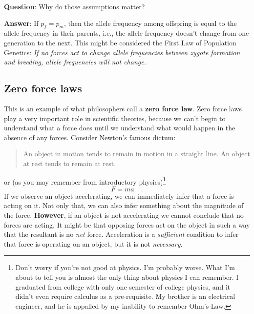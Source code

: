 \documentclass[12pt]{article}
\begin{document}
{\bf Question}: Why do those assumptions matter?

{\bf Answer}: If $p_f = p_m$, then the allele frequency among
offspring is equal to the allele frequency in their parents, i.e., the
allele frequency doesn't change from one generation to the next. This
might be considered the First Law of Population Genetics: {\it If no
  forces act to change allele frequencies between zygote formation and
  breeding, allele frequencies will not change.}

\subsection*{Zero force laws}

This is an example of what philosophers call a {\bf zero force
law}. Zero force laws play a very important role in scientific
theories, because we can't begin to understand what a force does until
we understand what would happen in the absence of any forces. Consider
Newton's famous dictum: 
\begin{quotation}
\noindent An object in motion tends to remain in motion in a straight
line. An object at rest tends to remain at rest.
\end{quotation}
or (as you may remember from introductory physics)\footnote{Don't
  worry if you're not good at physics. I'm probably worse. What I'm
  about to tell you is almost the only thing about physics I can
  remember. I graduated from college with only one semester of college
  physics, and it didn't even require calculus as a pre-requisite. My
  brother is an electrical engineer, and he is appalled by my
  inability to remember Ohm's Law.}
\[
F = ma \quad.
\]
\noindent If we observe an object accelerating, we can immediately
infer that a force is acting on it. Not only that, we can also infer
something about the magnitude of the force.  {\bf However}, if an
object is not accelerating we cannot conclude that no forces are
acting. It might be that opposing forces act on the object in such a
way that the resultant is no {\it net\/} force. Acceleration is a {\it
  sufficient\/} condition to infer that force is operating on an
object, but it is not {\it necessary}.
\end{document}

